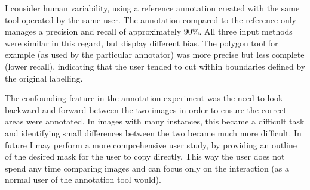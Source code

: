I consider human variability, using a reference annotation created with the same tool operated by the same user. The annotation compared to the reference only manages a precision and recall of approximately $90\%$. All three input methods were similar in this regard, but display different bias. The polygon tool for example (as used by the particular annotator) was more precise but less complete (lower recall), indicating that the user tended to cut within boundaries defined by the original labelling. 
 


\begin{table*}[!ht]
  \centering
    \caption{Statistics from annotating validation set in different ways. Precision, recall and IOU are a comparison with the original validation set. Note figures in brackets are the original statistics of the un-modified predictions from the model}

\noindent{}

\label{tab:annotation_exp}
\end{table*}


The confounding feature in the annotation experiment was the need to look backward and forward between the two images in order to ensure the correct areas were annotated. In images with many instances, this became a difficult task and identifying small differences between the two became much more difficult. In future I may perform a more comprehensive user study, by providing an outline of the desired mask for the user to copy directly. This way the user does not spend any time comparing images and can focus only on the interaction (as a normal user of the annotation tool would).


